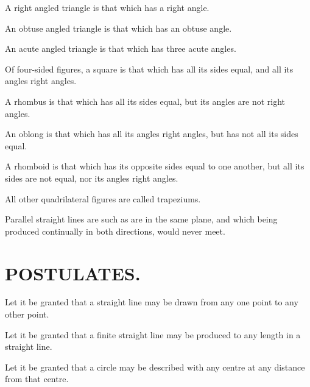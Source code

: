 \begin{bizarrelist}
                \label{def26}
			\item A right angled triangle is that which has a right angle.          
                \label{def27}
			\item An obtuse angled triangle is that which has an obtuse angle.      
                \label{def28}
			\item An acute angled triangle is that which has three acute angles.    
                \label{def29}
			\item Of four-sided figures, a square is that which has all its sides 
                equal, and all its angles right angles.                    
                \label{def30}
			\item A rhombus is that which has all its sides equal, but its angles 
                are not right angles.                         \label{def31}
			\item An oblong is that which has all its angles right angles, but has 
                not all its sides equal.                          \label{def32}
			\item A rhomboid is that which has its opposite sides equal to one 
                another, but all its sides are not equal, nor its angles 
                right angles.                           \label{def33}
			\item All other quadrilateral figures are called trapeziums.            
                \label{def34}
			\item Parallel straight lines are such as are in the same plane, and 
                which being produced continually in both directions, would 
                never meet.                            \label{def35}
		\end{bizarrelist}
		{\centering\section{POSTULATES.}
		\label{section\thesection}}
		\begin{bizarrelist}
			\item Let it be granted that a straight line may be drawn from any one 
                point to any other point.\label{post1}
			\item Let it be granted that a finite straight line may be produced to 
                any length in a straight line. \label{post2}
			\item Let it be granted that a circle may be described with any centre 
                at any distance from that centre.  \label{post3}
		\end{bizarrelist}
		

